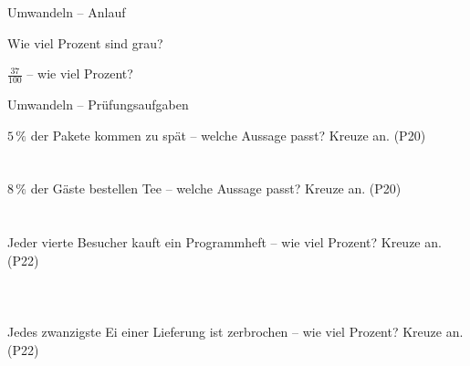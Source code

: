 \setcounter{aufgabe}{0}

\begin{aufgabe}{Umwandeln – Anlauf}
\begin{teile}
\teil Wie viel Prozent sind grau?

\teil $\frac{37}{100}$ – wie viel Prozent? \leerfeld[\%]
\end{teile}
\end{aufgabe}

\begin{aufgabe}{Umwandeln – Prüfungsaufgaben}
\begin{teile}
\teil $5\,\%$ der Pakete kommen zu spät – welche Aussage passt? Kreuze an. \hfill (P20)\\ \\ \\ 
\teil $8\,\%$ der Gäste bestellen Tee – welche Aussage passt? Kreuze an. \hfill (P20)\\ \\ \\ 
\teil Jeder vierte Besucher kauft ein Programmheft – wie viel Prozent? Kreuze an. \hfill (P22)\\ \\ \\ \\ 
\teil Jedes zwanzigste Ei einer Lieferung ist zerbrochen – wie viel Prozent? Kreuze an. \hfill (P22)\\ \\ \\ \\ 
\end{teile}
\end{aufgabe}

